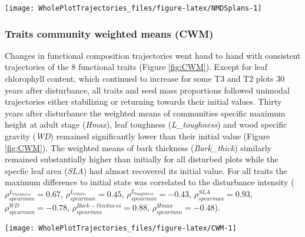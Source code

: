 \documentclass[fleqn,10pt]{ArtEcoFoG} %
\theoremstyle{definition}
\theoremstyle{definition}
\theoremstyle{definition}
\theoremstyle{remark}
\begin{document}
\begin{figure*}

{\centering \texttt{[image: WholePlotTrajectories\_files/figure-latex/NMDSplans-1]} 

}

\caption{Plot trajectories in terms of flora composition (left panels \textbf{(a)} and \textbf{(c)}) and functional composition (right panels \textbf{(b)} and \textbf{(d)}) in a two-dimensional NMDS space. Lower panels (\textbf{(c)} and \textbf{(d)}) represent the euclidean distance to initial condition along the 30 sampled years. Colors are treatments: green (control), blue (T1), orange (T2), red (T3) with shaded areas the credibility intervals}\label{fig:NMDSplans}
\end{figure*}

\subsubsection{Traits community weighted means
(CWM)}\label{traits-community-weighted-means-cwm}

Changes in functional composition trajectories went hand to hand with
consistent trajectories of the 8 functional traits (Figure
\ref{fig:CWM}). Except for leaf chlorophyll content, which continued to
increase for some T3 and T2 plots 30 years after disturbance, all traits
and seed mass proportions followed unimodal trajectories either
stabilizing or returning towards their initial values. Thirty years
after disturbance the weighted means of communities specific maximum
height at adult stage (\emph{Hmax}), leaf toughness
(\emph{L\_toughness}) and wood specific gravity (\emph{WD}) remained
significantly lower than their initial value (Figure \ref{fig:CWM}). The
weighted means of bark thickness (\emph{Bark\_thick}) similarly remained
substantially higher than initially for all disturbed plots while the
specfic leaf area (\emph{SLA}) had almost recovered its initial value.
For all traits the maximum difference to initial state was correlated to
the disturbance intensity (\(\rho_{spearman}^{L_{thickness}}=0.67\),
\(\rho_{spearman}^{L_{chloro}}=0.45\),
\(\rho_{spearman}^{L_{toughness}}=-0.43\),
\(\rho_{spearman}^{SLA}=0.93\), \(\rho_{spearman}^{WD}=-0.78\),
\(\rho_{spearman}^{Bark-thickness}=0.88\),
\(\rho_{spearman}^{Hmax}=-0.48\)).

\begin{figure*}

{\centering \texttt{[image: WholePlotTrajectories\_files/figure-latex/CWM-1]} 

}

\caption{Trajectories of the communities weighted means (CWM) over 30 years after disturbance of 4 leaf traits (Leaf thickness, \emph{L\_thickness}, chlorophyll content, \emph{L\_chloro}, toughness, \emph{L\_toughness} and specific area, \emph{SLA}), 2 stem traits (wood specific gravity, \emph{WD}, and bark thickness, \emph{Bark-thick}) and one life history trait (Specific maximum height at adult stage, \emph{Hmax}). Colors are treatments: green (control), blue (T1), orange (T2), red (T3) with shaded areas the credibility intervals.}\label{fig:CWM}
\end{figure*}
\end{document}
